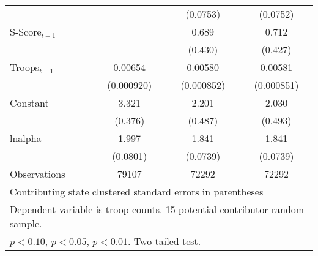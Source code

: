 \begin{table}[htbp]
\begin{tabular}{l*{3}{c}}
                    &                    &    (0.0753)        &    (0.0752)        \\
[0.25em]
S-Score$_{t-1}$             &                    &       0.689        &       0.712\sym{\dagger} \\
                    &                    &     (0.430)        &     (0.427)        \\
[0.25em]
Troops$_{t-1}$              &     0.00654\sym{**}&     0.00580\sym{**}&     0.00581\sym{**}\\
                    &  (0.000920)        &  (0.000852)        &  (0.000851)        \\
[0.25em]
Constant            &       3.321\sym{**}&       2.201\sym{**}&       2.030\sym{**}\\
                    &     (0.376)        &     (0.487)        &     (0.493)        \\
\hline
lnalpha             &       1.997\sym{**}&       1.841\sym{**}&       1.841\sym{**}\\
                    &    (0.0801)        &    (0.0739)        &    (0.0739)        \\
\hline
Observations        &       79107        &       72292        &       72292        \\
\hline\hline
\multicolumn{4}{l}{\footnotesize Contributing state clustered standard errors in parentheses}\\
\multicolumn{4}{l}{\footnotesize Dependent variable is troop counts. 15 potential contributor random sample.}\\
\multicolumn{4}{l}{\footnotesize \sym{\dagger} \(p<0.10\), \sym{*} \(p<0.05\), \sym{**} \(p<0.01\). Two-tailed test.}\\
\end{tabular}
\end{table}
